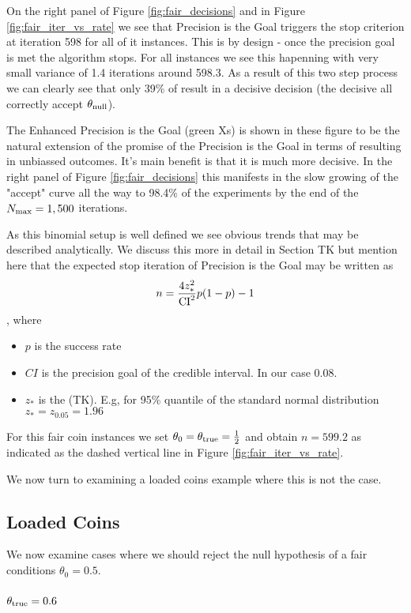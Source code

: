 On the right panel of Figure \ref{fig:fair_decisions} and in Figure \ref{fig:fair_iter_vs_rate}
we see that Precision is the Goal triggers the stop criterion at iteration 598 for all of
it instances. This is by design - once the precision goal is met the algorithm stops.
For all instances we see this hapenning with very small variance of 1.4 iterations around 598.3.
As a result of this two step process we can clearly see that only 39\% of result in a decisive decision
(the decisive all correctly accept $\theta_{\rm null}$). 

The Enhanced Precision is the Goal (green Xs) is shown in these figure to be the natural extension
of the promise of the Precision is the Goal in terms of resulting in unbiassed outcomes. It's main 
benefit is that it is much more decisive. In the right panel of Figure \ref{fig:fair_decisions}
this manifests in the slow growing of the "accept" curve all the way to 98.4\% of the experiments
by the end of the $N_{\rm max}=1,500$ iterations.

As this binomial setup is well defined we see obvious trends
that may be described analytically. We discuss this more in detail
in Section TK but mention here that the expected stop iteration of Precision is the Goal
may be written as $$n = \frac{4 z_{*}^2}{\rm{CI}^2}p(1-p) - 1$$,
where 

\begin{itemize}
  \item $p$ is the success rate
  \item $CI$ is the precision goal of the credible interval. In our case 0.08.
  \item $z_{*}$ is the (TK). E.g, for 95\% quantile of the standard normal
  distribution $z_{*}=z_{0.05}=1.96$
\end{itemize}

For this fair coin instances we set $\theta_0=\theta_{\rm true}=\frac{1}{2}$ and obtain
$n=599.2$ as indicated as the dashed vertical line in Figure \ref{fig:fair_iter_vs_rate}.

We now turn to examining a loaded coins example where this is not the case.

\subsection{Loaded Coins}
We now examine cases where we should reject the null hypothesis of a fair conditions
$\theta_{0}=0.5$.

\subsubsection{$\theta_{\rm true}=0.6$}


